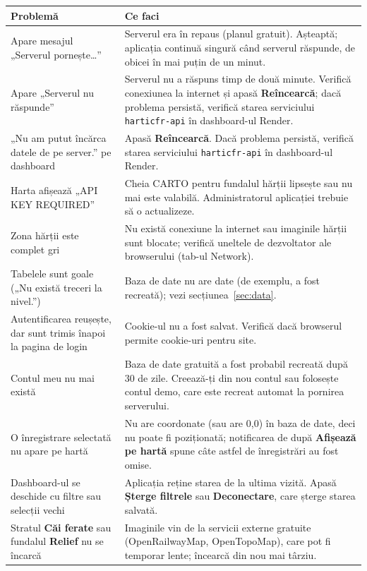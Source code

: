 \documentclass[11pt,a4paper]{article}
\newcommand{\code}[1]{\texttt{#1}}
\newcommand{\ui}[1]{\textsf{\textbf{#1}}}
\begin{document}
\begin{longtable}{@{}>{\raggedright\arraybackslash}p{5cm}>{\raggedright\arraybackslash}p{10.4cm}@{}}
\toprule
\textbf{Problemă} & \textbf{Ce faci} \\
\midrule
\endhead
Apare mesajul „Serverul pornește\dots” &
  Serverul era în repaus (planul gratuit). Așteaptă; aplicația continuă
  singură când serverul răspunde, de obicei în mai puțin de un minut. \\[4pt]
Apare „Serverul nu răspunde” &
  Serverul nu a răspuns timp de două minute. Verifică conexiunea la internet
  și apasă \ui{Reîncearcă}; dacă problema persistă, verifică starea
  serviciului \code{harticfr-api} în dashboard-ul Render. \\[4pt]
„Nu am putut încărca datele de pe server.” pe dashboard &
  Apasă \ui{Reîncearcă}. Dacă problema persistă, verifică starea serviciului
  \code{harticfr-api} în dashboard-ul Render. \\[4pt]
Harta afișează „API KEY REQUIRED” &
  Cheia CARTO pentru fundalul hărții lipsește sau nu mai este valabilă.
  Administratorul aplicației trebuie să o actualizeze. \\[4pt]
Zona hărții este complet gri &
  Nu există conexiune la internet sau imaginile hărții sunt blocate;
  verifică uneltele de dezvoltator ale browserului (tab-ul Network). \\[4pt]
Tabelele sunt goale („Nu există treceri la nivel.”) &
  Baza de date nu are date (de exemplu, a fost recreată); vezi
  secțiunea~\ref{sec:data}. \\[4pt]
Autentificarea reușește, dar sunt trimis înapoi la pagina de login &
  Cookie-ul nu a fost salvat. Verifică dacă browserul permite cookie-uri
  pentru site. \\[4pt]
Contul meu nu mai există &
  Baza de date gratuită a fost probabil recreată după 30 de zile. Creează-ți
  din nou contul sau folosește contul demo, care este recreat automat la
  pornirea serverului. \\[4pt]
O înregistrare selectată nu apare pe hartă &
  Nu are coordonate (sau are 0,0) în baza de date, deci nu poate fi
  poziționată; notificarea de după \ui{Afișează pe hartă} spune câte
  astfel de înregistrări au fost omise. \\[4pt]
Dashboard-ul se deschide cu filtre sau selecții vechi &
  Aplicația reține starea de la ultima vizită. Apasă \ui{Șterge filtrele}
  sau \ui{Deconectare}, care șterge starea salvată. \\[4pt]
Stratul \ui{Căi ferate} sau fundalul \ui{Relief} nu se încarcă &
  Imaginile vin de la servicii externe gratuite (OpenRailwayMap,
  OpenTopoMap), care pot fi temporar lente; încearcă din nou mai târziu. \\
\bottomrule
\end{longtable}
\end{document}
